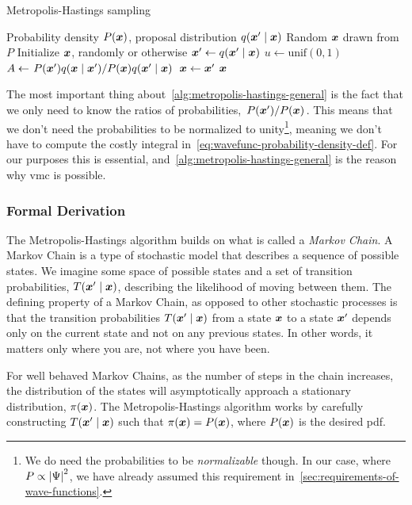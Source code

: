 \documentclass[Thesis.tex]{subfiles}
\begin{document}
\begin{algorithm}[h]
    \caption{Metropolis-Hastings sampling}
    \label{alg:metropolis-hastings-general}
    \begin{algorithmic}[1]
        \Require Probability density $P(\bm{x})$, proposal distribution $q\qty(\bm{x}'\;\middle|\;\bm{x})$
        \Ensure Random $\bm{x}$ drawn from $P$
        \State Initialize $\bm{x}$, randomly or otherwise
        \Repeat
          \State $\bm{x}'\gets q\qty(\bm{x}'\;\middle|\;\bm{x})$
          \State $u\gets\text{unif}(0, 1)$
          \State $A\gets \flatfrac{P(\vx')q\qty(\vx\;\middle|\;\vx')}{P(\vx)q\qty(\vx'\;\middle|\;\vx)}$
            \State $\bm{x} \gets \bm{x}'$
          \EndIf
          \State \Yield $\bm{x}$
    \end{algorithmic}
\end{algorithm}

The most important thing about~\cref{alg:metropolis-hastings-general} is the
fact that we only need to know the ratios of probabilities,
$\flatfrac{P(\vx')}{P(\vx)}$. This means that we don't need the probabilities to
be normalized to unity\footnote{We do need the probabilities to be
\emph{normalizable} though. In our case, where $P\propto \abs{\Psi}^2$, we have
already assumed this requirement in~\cref{sec:requirements-of-wave-functions}.},
meaning we don't have to compute the costly integral
in~\cref{eq:wavefunc-probability-density-def}. For our purposes this is
essential, and~\cref{alg:metropolis-hastings-general} is the reason why \gls{vmc} is
possible.

\subsubsection{Formal Derivation}

The Metropolis-Hastings algorithm builds on what is called a \emph{Markov Chain}. A
Markov Chain is a type of stochastic model that describes a sequence of possible
states. We imagine some space of possible states and a set of transition
probabilities, $T\qty(\bm{x}'\;\middle|\;\bm{x})$, describing the likelihood of moving between them.
The defining property of a Markov Chain, as opposed to other stochastic
processes is that the transition probabilities $T\qty(\bm{x}'\;\middle|\;\bm{x})$ from a state $\bm{x}$
to a state $\bm{x}'$ depends only on the current state and not on any previous
states. In other words, it matters only where you are, not where you have been.

For well behaved Markov Chains, as the number of steps in the chain increases,
the distribution of the states will asymptotically approach a stationary
distribution, $\pi(\bm{x})$. The Metropolis-Hastings algorithm works by carefully
constructing $T\qty(\bm{x}'\;\middle|\;\bm{x})$ such that $\pi(\bm{x})=P(\bm{x})$, where $P(\bm{x})$ is the
desired \gls{pdf}.
\end{document}
